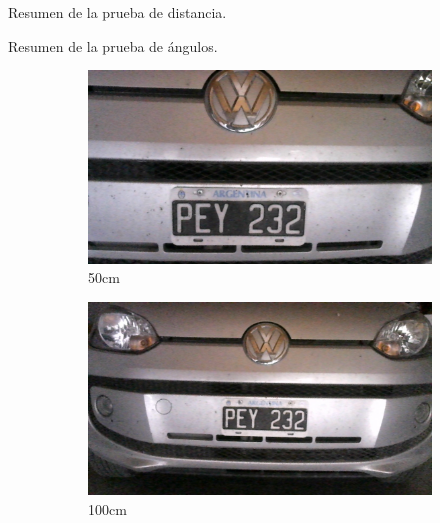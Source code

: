 \begin{table}
    \centering
    
    \caption{Resumen de la prueba de distancia.}
    \label{tab:resumen-distancia}
\end{table}

\begin{table}
    \centering
    
    \caption{Resumen de la prueba de ángulos.}
    \label{tab:resumen-angulo}
\end{table}

\begin{figure}
    \centering
    \begin{subfigure}{.3\textwidth}
        \centering
        \includegraphics[width=\textwidth]{imgs/test-distancia/0_50.jpg}
        \caption{50cm}
    \end{subfigure}
    \begin{subfigure}{.3\textwidth}
        \centering
        \includegraphics[width=\textwidth]{imgs/test-distancia/0_100.jpg}
        \caption{100cm}
    \end{subfigure}
    \begin{subfigure}{.3\textwidth}

\end{subfigure}
\end{figure}
